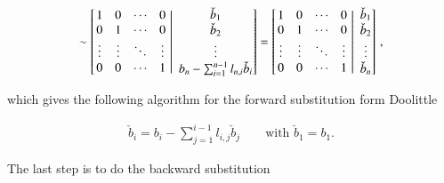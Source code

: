 \documentclass[11pt,english,a4paper]{article}
\begin{document}
\begin{flushleft}
\begin{align*}
\sim \left[{\left.\begin{matrix} 1 & 0 & \cdots & 0 \\ 0 & 1 & \cdots & 0 \\ \vdots & \vdots & \ddots & \vdots \\ 0 & 0 & \cdots & 1  \end{matrix}\,\,\right\vert\,\,\begin{matrix} \check b_1 \\ \check b_2 \\ \vdots \\ b_n -\sum_{i=1}^{n-1} l_{n,i}\check b_i \end{matrix}}\right]
= \left[{\left.\begin{matrix} 1 & 0 & \cdots & 0 \\ 0 & 1 & \cdots & 0 \\ \vdots & \vdots & \ddots & \vdots \\ 0 & 0 & \cdots & 1  \end{matrix}\,\,\right\vert\,\,\begin{matrix} \check b_1 \\ \check b_2 \\ \vdots \\ \check b_n \end{matrix}}\right] \,,
\end{align*}

which gives the following algorithm for the forward substitution form Doolittle

\begin{align}
\check b_i = b_i - \sum_{j=1}^{i-1} l_{i,j}\check b_j \qquad \text{with $\check b_1 = b_1$.}
\label{eq_3}
\end{align}

The last step is to do the backward substitution


\end{flushleft}
\end{document}
